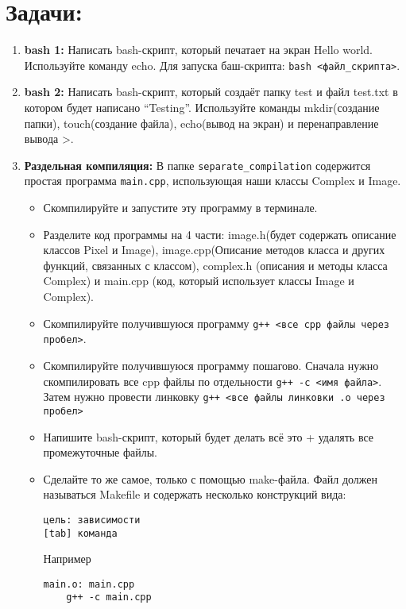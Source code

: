\documentclass{article}
\begin{document}
\section*{Задачи:}
\begin{enumerate}
\item \textbf{bash 1:} Написать bash-скрипт, который печатает на экран Hello world. Используйте команду echo. Для запуска баш-скрипта: \texttt{bash <файл\_скрипта>}.
\item \textbf{bash 2:} Написать bash-скрипт, который создаёт папку test и файл test.txt в котором будет написано ``Testing''. Используйте команды mkdir(создание папки), touch(создание файла), echo(вывод на экран) и перенаправление вывода >.
\item \textbf{Раздельная компиляция:} В папке \texttt{separate\_compilation} содержится простая программа \texttt{main.cpp}, использующая наши классы Complex и Image.
\begin{itemize}
\item Скомпилируйте и запустите эту программу в терминале.
\item Разделите код программы на 4 части: image.h(будет содержать описание классов Pixel и Image), image.cpp(Описание методов класса и других функций, связанных с классом), complex.h (описания и методы класса Complex) и main.cpp (код, который использует классы Image и Complex).
\item Скомпилируйте получившуюся программу \texttt{g++ <все cpp файлы через пробел>}.
\item Скомпилируйте получившуюся программу пошагово. Сначала нужно скомпилировать все cpp файлы по отдельности \texttt{g++ -c <имя файла>}. Затем нужно провести линковку \texttt{g++ <все файлы линковки .o через пробел>}
\item Напишите bash-скрипт, который будет делать всё это + удалять все промежуточные файлы.
\item Сделайте то же самое, только с помощью make-файла. Файл должен называться Makefile и содержать несколько конструкций вида:
\begin{verbatim}
цель: зависимости
[tab] команда
\end{verbatim}
Например
\begin{verbatim}
main.o: main.cpp
    g++ -c main.cpp
\end{verbatim}
\end{itemize}
\end{enumerate}

\newpage
\end{document}
